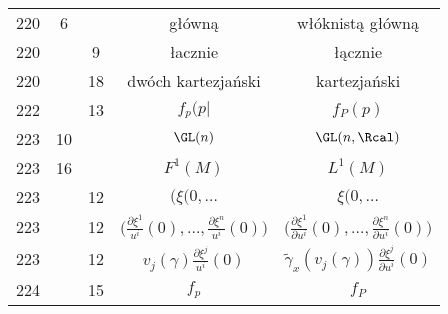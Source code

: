 \documentclass[a4paper,11pt]{article}
\numberwithin{equation}{section}
\begin{document}
\begin{center}
\begin{tabular}{|c|c|c|c|c|}
    220 & \hphantom{0}6 & & główną & włóknistą główną \\
    220 & & \hphantom{0}9 & łacznie & łącznie \\
    220 & & 18 & dwóch kartezjański & kartezjański \\
    222 & & 13 & $f_{ p }( p |$ & $f_{ P }( p )$ \\
    223 & 10 & & $\GL( n )$ & $\GL( n, \Rcal )$ \\
    223 & 16 & & $F^{ 1 }( M )$ & $L^{ 1 }( M )$ \\
    223 & & 12 & $( \xi( 0, \ldots$ & $\xi( 0, \ldots$ \\[0.4em]
    223 & & 12 & $\big( \frac{ \partial \xi^{ 1 } }{ u^{ i } }( 0 ), \ldots,
                 \frac{ \partial \xi^{ n } }{ u^{ i } }( 0 ) \big)$
           & $\big( \frac{ \partial \xi^{ 1 } }{ \partial u^{ i } }( 0 ), \ldots,
             \frac{ \partial \xi^{ n } }{ \partial u^{ i } }( 0 ) \big)$ \\
    223 & & 12 & $v_{ j }( \gamma ) \frac{ \partial \xi ^{ j } }{ u^{ i } }( 0 )$
           & $\widetilde{ \gamma }_{ x }( v_{ j }( \gamma ) )
             \frac{ \partial \xi ^{ j } }{ \partial u^{ i } }( 0 )$ \\
    224 & & 15 & $f_{ p }$ & $f_{ P }$ \\
    \hline
  \end{tabular}





  \newpage


\end{center}
\end{document}
